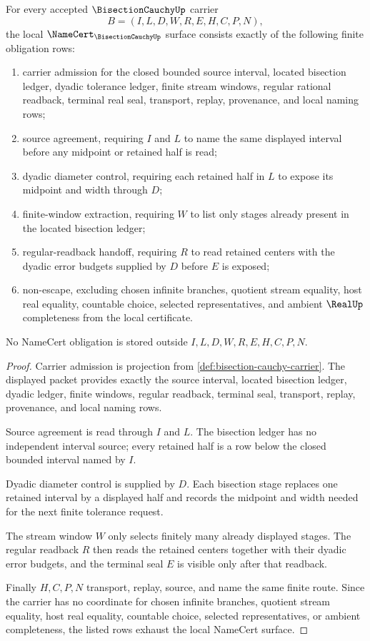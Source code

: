 \begin{theorem}
\label{thm:bisection-cauchy-namecert-obligations}
For every accepted $\BisectionCauchyUp$ carrier
$$
B=(I,L,D,W,R,E,H,C,P,N),
$$
the local $\NameCert_{\BisectionCauchyUp}$ surface consists exactly of the following finite obligation rows:
\begin{enumerate}
\item carrier admission for the closed bounded source interval, located bisection ledger, dyadic tolerance ledger, finite stream windows, regular rational readback, terminal real seal, transport, replay, provenance, and local naming rows;
\item source agreement, requiring $I$ and $L$ to name the same displayed interval before any midpoint or retained half is read;
\item dyadic diameter control, requiring each retained half in $L$ to expose its midpoint and width through $D$;
\item finite-window extraction, requiring $W$ to list only stages already present in the located bisection ledger;
\item regular-readback handoff, requiring $R$ to read retained centers with the dyadic error budgets supplied by $D$ before $E$ is exposed;
\item non-escape, excluding chosen infinite branches, quotient stream equality, host real equality, countable choice, selected representatives, and ambient $\RealUp$ completeness from the local certificate.
\end{enumerate}
No NameCert obligation is stored outside $I,L,D,W,R,E,H,C,P,N$.
\end{theorem}
\begin{proof}
Carrier admission is projection from \autoref{def:bisection-cauchy-carrier}. The displayed packet provides exactly the source interval, located bisection ledger, dyadic ledger, finite windows, regular readback, terminal seal, transport, replay, provenance, and local naming rows.

Source agreement is read through $I$ and $L$. The bisection ledger has no independent interval source; every retained half is a row below the closed bounded interval named by $I$.

Dyadic diameter control is supplied by $D$. Each bisection stage replaces one retained interval by a displayed half and records the midpoint and width needed for the next finite tolerance request.

The stream window $W$ only selects finitely many already displayed stages. The regular readback $R$ then reads the retained centers together with their dyadic error budgets, and the terminal seal $E$ is visible only after that readback.

Finally $H,C,P,N$ transport, replay, source, and name the same finite route. Since the carrier has no coordinate for chosen infinite branches, quotient stream equality, host real equality, countable choice, selected representatives, or ambient completeness, the listed rows exhaust the local NameCert surface.
\end{proof}

